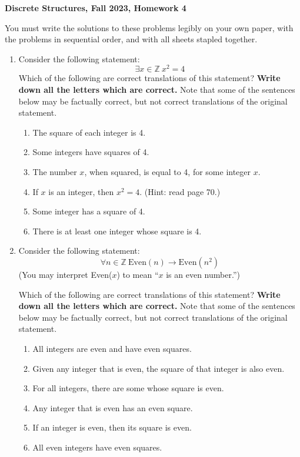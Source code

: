\documentclass[12pt, letterpaper]{report}
\newcommand{\Z}{\mathbb{Z}}
\begin{document}
{\textbf{Discrete Structures, Fall 2023, Homework 4}}

\medbreak

You must write the solutions to these problems legibly on your own paper, with
the problems in sequential order, and with all sheets stapled together.

\begin{enumerate}

\item Consider the following statement:
$$\exists x \in \Z \ x^2=4$$
Which of the following are correct translations of this statement?  \textbf{Write down all the letters which are correct.}
Note that some of the sentences below may be factually correct, but not correct translations of the original statement.
\begin{enumerate}
        \item The square of each integer is 4.
        \item Some integers have squares of 4.
        \item The number $x$, when squared, is equal to 4, for some integer $x$.
        \item If $x$ is an integer, then $x^2=4$.  (Hint: read page 70.)
        \item Some integer has a square of 4.
        \item There is at least one integer whose square is 4.
\end{enumerate}

\item Consider the following statement:
$$\forall n \in \Z \ \text{Even}(n) \to \text{Even}(n^2)$$
(You may interpret Even($x$) to mean ``$x$ is an even number.'')

Which of the following are correct translations of this statement?  \textbf{Write down all the letters which are correct.}
Note that some of the sentences below may be factually correct, but not correct translations of the original statement.
\begin{enumerate}
        \item All integers are even and have even squares.
        \item Given any integer that is even, the square of that integer is also even.
        \item For all integers, there are some whose square is even.
        \item Any integer that is even has an even square.
        \item If an integer is even, then its square is even.
        \item All even integers have even squares.
\end{enumerate}


\end{enumerate}
\end{document}
